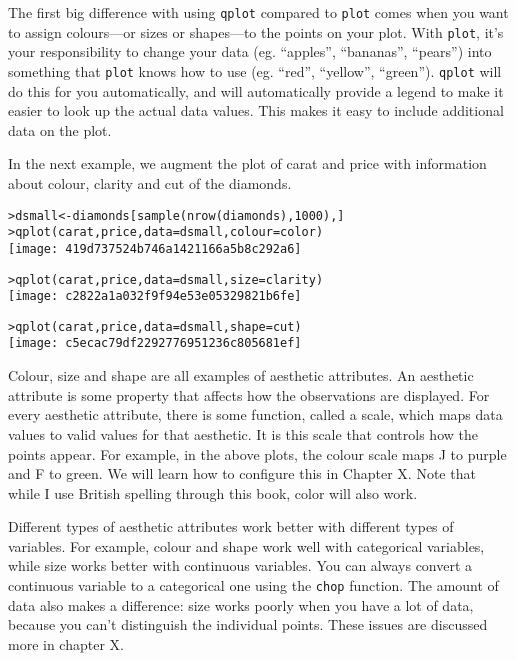 The first big difference with using {\tt qplot} compared to {\tt plot} comes when you want to assign colours---or sizes or shapes---to the points on your plot.  With {\tt plot}, it's your responsibility to change your data (eg. ``apples'', ``bananas'', ``pears'') into something that {\tt plot} knows how to use (eg. ``red'', ``yellow'', ``green'').  {\tt qplot} will do this for you automatically, and will automatically provide a legend to make it easier to look up the actual data values.  This makes it easy to include additional data on the plot.  

In the next example, we augment the plot of carat and price with information about colour, clarity and cut of the diamonds.

\begin{alltt}
> dsmall <- diamonds[sample(nrow(diamonds), 1000), ]
> qplot(carat, price, data = dsmall, colour = color)
\texttt{[image: 419d737524b746a1421166a5b8c292a6]}

> qplot(carat, price, data = dsmall, size = clarity)
\texttt{[image: c2822a1a032f9f94e53e05329821b6fe]}

> qplot(carat, price, data = dsmall, shape = cut)
\texttt{[image: c5ecac79df2292776951236c805681ef]}

\end{alltt}

Colour, size and shape are all examples of aesthetic attributes.  An aesthetic attribute is some property that affects how the observations are displayed.  For every aesthetic attribute, there is some function, called a scale, which maps data values to valid values for that aesthetic.  It is this scale that controls how the points appear.  For example, in the above plots, the colour scale maps J to purple and F to green.  We will learn how to configure this in Chapter X.  Note that while I use British spelling through this book, color will also work.

Different types of aesthetic attributes work better with different types of variables.  For example, colour and shape work well with categorical variables, while size works better with continuous variables.  You can always convert a continuous variable to a categorical one using the {\tt chop} function. The amount of data also makes a difference:  size works poorly when you have a lot of data, because you can't distinguish the individual points.  These issues are discussed more in chapter X.

